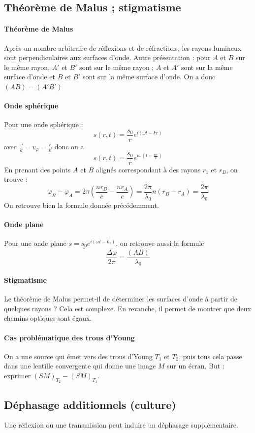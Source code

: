 \documentclass[french]{book}
\theoremstyle{plain}
\theoremstyle{definition}
\theoremstyle{remark}
\begin{document}
\subsection{Théorème de Malus ; stigmatisme}
\paragraph{Théorème de Malus} Après un nombre arbitraire de réflexions et de réfractions, les rayons lumineux sont perpendiculaires aux surfaces d’onde. Autre présentation : pour $A$ et $B$ sur le même rayon, $A'$ et $B'$ sont sur le même rayon ;  $A$ et $A'$ sont sur la même surface d’onde et $B$ et $B'$ sont sur la même surface d’onde. On a donc $(AB) = (A'B')$
\paragraph{Onde sphérique} Pour une onde sphérique : $$s(r,t)=\frac{s_0}{r}e^{i(\omega t-kr)}$$ avec $\displaystyle\frac{\omega}{k}=v_\varphi=\frac{c}{n}$ donc on a $$s(r,t)=\frac{s_0}{r}e^{i\omega\left(t-\frac{nr}{c}\right)}$$ En prenant des points $A$ et $B$ alignés correspondant à des rayons $r_1$ et $r_B$, on trouve : $$\varphi_B-\varphi_A=2\pi\left(\frac{nr_B}{c}-\frac{nr_A}{c}\right)=\frac{2\pi}{\lambda_0}n(r_B-r_A)=\frac{2\pi}{\lambda_0}$$ On retrouve bien la formule donnée précédemment.
\paragraph{Onde plane} Pour une onde plane $\underline{s}=\underline{s_0}e^{i(\omega t-k_z)}$, on retrouve aussi la formule $$\frac{\Delta\varphi}{2\pi}=\frac{(AB)}{\lambda_0}$$
\paragraph{Stigmatisme} Le théorème de Malus permet-il de déterminer les surfaces d'onde à partir de quelques rayons ? Cela est complexe. En revanche, il permet de montrer que deux chemins optiques sont égaux.
\paragraph{Cas problématique des trous d'Young} On a une source qui émet vers des trous d'Young $T_1$ et $T_2$, puis tous cela passe dans une lentille convergente qui donne une image $M$ sur un écran. But : exprimer $(SM)_{T_2}-(SM)_{T_1}$.
\subsection{Déphasage additionnels (culture)}
Une réflexion ou une transmission peut induire un déphasage supplémentaire.
\end{document}
